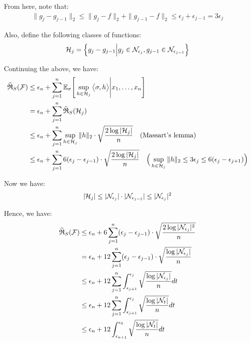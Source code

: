 \begin{proof*}
    \noindent From here, note that:
    \begin{align*}
        \|g_j - g_{j-1}\|_2 \le \|g_j - f\|_2 + \|g_{j-1}-f\|_2 \le \epsilon_j + \epsilon_{j-1} = 3\epsilon_j
    \end{align*}

    \noindent Also, define the following classes of functions:
    \begin{align*}
        \mathcal{H}_j = \Big\{ 
            g_j - g_{j-1}\Big| 
            g_j \in \mathcal{N}_{\epsilon_j},
            g_{j-1} \in \mathcal{N}_{\epsilon_{j-1}}
         \Big\}
    \end{align*}

    \noindent Continuing the above, we have:
    \begin{align*}
        \widehat{\mathfrak{R}}_S(\mathcal{F}) &\le \epsilon_n + \sum_{j=1}^n \mathbb{E}_\sigma\Bigg[ 
            \sup_{h\in\mathcal{H}_j} \big<\sigma, h \big> \Bigg| x_1, \dots, x_n
         \Bigg] \\
        &= \epsilon_n + \sum_{j=1}^n \widehat{\mathfrak{R}}_S(\mathcal{H}_j) \\
        &\le  \epsilon_n + \sum_{j=1}^n \sup_{h\in \mathcal{H}_j} \|h\|_2 \cdot \sqrt{
            \frac{2\log|\mathcal{H}_j|}{n}
        } \ \ \ (\text{Massart's lemma}) \\
        &\le \epsilon_n + \sum_{j=1}^n 6(\epsilon_j - \epsilon_{j-1}) \cdot \sqrt{
            \frac{2\log|\mathcal{H}_j|}{n}
        } \ \ \ \Big(\sup_{h\in \mathcal{H}_j} \|h\|_2 \le 3\epsilon_j \le 6(\epsilon_j - \epsilon_{j+1})\Big)
    \end{align*}

    \noindent Now we have:
    \begin{align*}
        |\mathcal{H}_j| \le |\mathcal{N}_{\epsilon_j}| \cdot |\mathcal{N}_{\epsilon_{j-1}}| \le |\mathcal{N}_{\epsilon_j}|^2
    \end{align*}

    \noindent Hence, we have:
    \begin{align*}
        \widehat{\mathfrak{R}}_S(\mathcal{F}) &\le \epsilon_n + 6\sum_{j=1}^n (\epsilon_j - \epsilon_{j-1}) \cdot \sqrt{
            \frac{2\log|\mathcal{N}_{\epsilon_j}|^2}{n}
        } \\
        &= \epsilon_n + 12\sum_{j=1}^n (\epsilon_j - \epsilon_{j-1}) \cdot \sqrt{
            \frac{\log|\mathcal{N}_{\epsilon_j}|}{n}
        } \\
        &\le \epsilon_n + 12\sum_{j=1}^n \int_{\epsilon_{j+1}}^{\epsilon_j} \sqrt{
            \frac{\log|\mathcal{N}_{\epsilon_j}|}{n}
        }dt \\
        &\le \epsilon_n + 12\sum_{j=1}^n \int_{\epsilon_{j+1}}^{\epsilon_j} \sqrt{
            \frac{\log|\mathcal{N}_t|}{n}
        }dt \\
        &\le  \epsilon_n + 12 \int_{\epsilon_{n+1}}^{\epsilon_0} \sqrt{
            \frac{\log|\mathcal{N}_t|}{n}
        }dt
    \end{align*}


\end{proof*}
